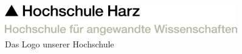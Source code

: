  
    \begin{figure}[H]
        \centering
        \includegraphics[width=0.9\textwidth]{graphics/HSHARZ.png}
        \caption[Hochschullogo]{Das Logo unserer Hochschule}
        \label{fig:appendix_logo}
    \end{figure}


